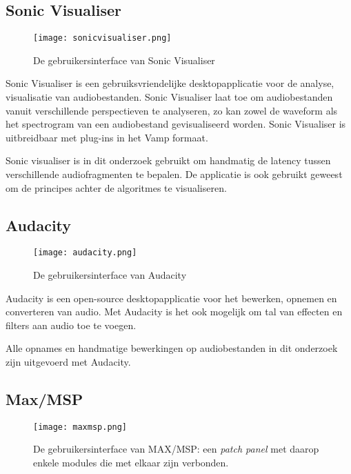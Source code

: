 \subsection{Sonic Visualiser}

\begin{figure}[!h]
	\captionsetup{width=0.7\textwidth}
	\caption[Gebruikersinterface van Sonic Visualiser]{De gebruikersinterface van Sonic Visualiser}
	\advance\parskip0.3cm
	\centering
	\texttt{[image: sonicvisualiser.png]}
\end{figure}

Sonic Visualiser is een gebruiksvriendelijke desktopapplicatie voor de analyse, visualisatie van audiobestanden. Sonic Visualiser laat toe om audiobestanden vanuit verschillende perspectieven te analyseren, zo kan zowel de waveform als het spectrogram van een audiobestand gevisualiseerd worden. Sonic Visualiser is uitbreidbaar met plug-ins in het Vamp formaat. \cite{cannam2010sonic}

Sonic visualiser is in dit onderzoek gebruikt om handmatig de latency tussen verschillende audiofragmenten te bepalen. De applicatie is ook gebruikt geweest om de principes achter de algoritmes te visualiseren. 

\subsection{Audacity}

\begin{figure}[!h]
	\captionsetup{width=0.7\textwidth}
	\caption[Gebruikersinterface van Audacity]{De gebruikersinterface van Audacity}
	\centering
	\advance\parskip0.3cm
	\texttt{[image: audacity.png]}
\end{figure}

Audacity is een open-source desktopapplicatie voor het bewerken, opnemen en converteren van audio. Met Audacity is het ook mogelijk om tal van effecten en filters aan audio toe te voegen.\cite{audacity2016}

Alle opnames en handmatige bewerkingen op audiobestanden in dit onderzoek zijn uitgevoerd met Audacity.


\subsection{Max/MSP}

\begin{figure}[!h]
	\captionsetup{width=0.7\textwidth}
	\caption[Gebruikersinterface van MAX/MSP]{De gebruikersinterface van MAX/MSP: een \textit{patch panel} met daarop enkele modules die met elkaar zijn verbonden.}
	\centering
	\advance\parskip0.3cm
	\texttt{[image: maxmsp.png]}
\end{figure}

